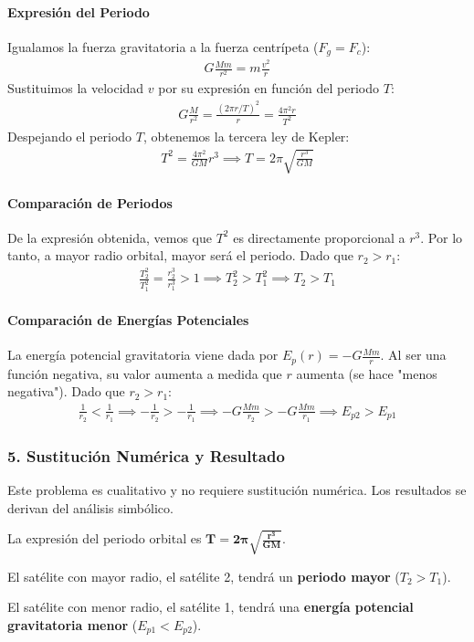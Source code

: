 \paragraph*{Expresión del Periodo}
Igualamos la fuerza gravitatoria a la fuerza centrípeta ($F_g = F_c$):
\begin{gather}
    G \frac{M m}{r^2} = m \frac{v^2}{r}
\end{gather}
Sustituimos la velocidad $v$ por su expresión en función del periodo $T$:
\begin{gather}
    G \frac{M}{r^2} = \frac{(2\pi r/T)^2}{r} = \frac{4\pi^2 r}{T^2}
\end{gather}
Despejando el periodo $T$, obtenemos la tercera ley de Kepler:
\begin{gather}
    T^2 = \frac{4\pi^2}{G M} r^3 \implies T = 2\pi \sqrt{\frac{r^3}{G M}}
\end{gather}

\paragraph*{Comparación de Periodos}
De la expresión obtenida, vemos que $T^2$ es directamente proporcional a $r^3$. Por lo tanto, a mayor radio orbital, mayor será el periodo. Dado que $r_2 > r_1$:
\begin{gather}
    \frac{T_2^2}{T_1^2} = \frac{r_2^3}{r_1^3} > 1 \implies T_2^2 > T_1^2 \implies T_2 > T_1
\end{gather}

\paragraph*{Comparación de Energías Potenciales}
La energía potencial gravitatoria viene dada por $E_p(r) = -G \frac{M m}{r}$. Al ser una función negativa, su valor aumenta a medida que $r$ aumenta (se hace "menos negativa"). Dado que $r_2 > r_1$:
\begin{gather}
    \frac{1}{r_2} < \frac{1}{r_1} \implies -\frac{1}{r_2} > -\frac{1}{r_1} \implies -G\frac{Mm}{r_2} > -G\frac{Mm}{r_1} \implies E_{p2} > E_{p1}
\end{gather}

\subsubsection*{5. Sustitución Numérica y Resultado}
Este problema es cualitativo y no requiere sustitución numérica. Los resultados se derivan del análisis simbólico.
\begin{cajaresultado}
    La expresión del periodo orbital es $\boldsymbol{T = 2\pi \sqrt{\frac{r^3}{G M}}}$.
\end{cajaresultado}
\begin{cajaresultado}
    El satélite con mayor radio, el satélite 2, tendrá un \textbf{periodo mayor} ($T_2 > T_1$).
\end{cajaresultado}
\begin{cajaresultado}
    El satélite con menor radio, el satélite 1, tendrá una \textbf{energía potencial gravitatoria menor} ($E_{p1} < E_{p2}$).
\end{cajaresultado}

